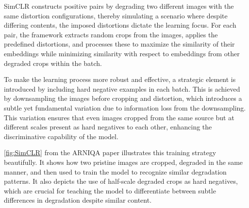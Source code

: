 \vspace{\baselineskip}
\noindent
SimCLR constructs positive pairs by degrading two different images with the same distortion configurations, thereby simulating a scenario where despite differing contents, the imposed distortions dictate the learning focus. For each pair, the framework extracts random crops from the images, applies the predefined distortions, and processes these to maximize the similarity of their embeddings while minimizing similarity with respect to embeddings from other degraded crops within the batch. \par
\vspace{\baselineskip}
\noindent
To make the learning process more robust and effective, a strategic element is introduced by including hard negative examples in each batch. This is achieved by downsampling the images before cropping and distortion, which introduces a subtle yet fundamental variation due to information loss from the downsampling. This variation ensures that even images cropped from the same source but at different scales present as hard negatives to each other, enhancing the discriminative capability of the model. \par
\vspace{\baselineskip}
\noindent
\autoref{fig:SimCLR} from the ARNIQA paper illustrates this training strategy beautifully. It shows how two pristine images are cropped, degraded in the same manner, and then used to train the model to recognize similar degradation patterns. It also depicts the use of half-scale degraded crops as hard negatives, which are crucial for teaching the model to differentiate between subtle differences in degradation despite similar content. \par
\vspace{\baselineskip}
\noindent

